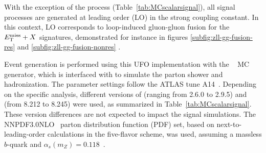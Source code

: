 \begin{table}[h!]
\centering
{}
\caption{Details of the \MGNLO generation set-up used for the \thdma signal samples, for the signatures considered in this publication.
The \texttt{Pseudoscalar\_2HDM} UFO model is used for all simulated samples except those for the \htb search, which relies on the UFO of reference~\cite{Degrande:2015vpa}.
The \hinv\ and \hlrs signatures are not listed here as no signal samples are required for the re-interpretation, which in those cases relies on the branching ratio limits \cite{2hdma_comb}.}
\label{tab:MCscalarsignal}
\end{table}

With the exception of the \htb process (Table~\ref{tab:MCscalarsignal}), 
all signal processes are generated at leading order (LO) in the strong coupling constant. 
In this context, LO corresponds to loop-induced gluon-gluon fusion for the $E_{\mathrm{T}}^{\mathrm{miss}}+X$ signatures, 
demonstrated for instance in figures \ref{subfig:zll-gg-fusion-res} and \ref{subfig:zll-gg-fusion-nonres} \cite{2hdma_comb}.

Event generation is performed using this UFO implementation with the \MGNLO~\cite{Alwall:2014hca} MC generator, 
which is interfaced with \cite{Sjostrand:2014zea} to simulate the parton shower and hadronization. 
The parameter settings follow the ATLAS tune A14~\cite{ATL-PHYS-PUB-2014-021}. 
Depending on the specific analysis, different versions of \MGNLO (ranging from 2.6.0 to 2.9.5) 
and \PYTHIA (from 8.212 to 8.245) were used, as summarized in Table~\ref{tab:MCscalarsignal}. 
These version differences are not expected to impact the signal simulations. 
The NNPDF3.0NLO~\cite{Ball:2014uwa} parton distribution function (PDF) set, 
based on next-to-leading-order calculations in the five-flavor scheme, was used, 
assuming a massless $b$-quark and $\alpha_{s}(m_{Z}) = 0.118$~\cite{Ball:2014uwa}.


